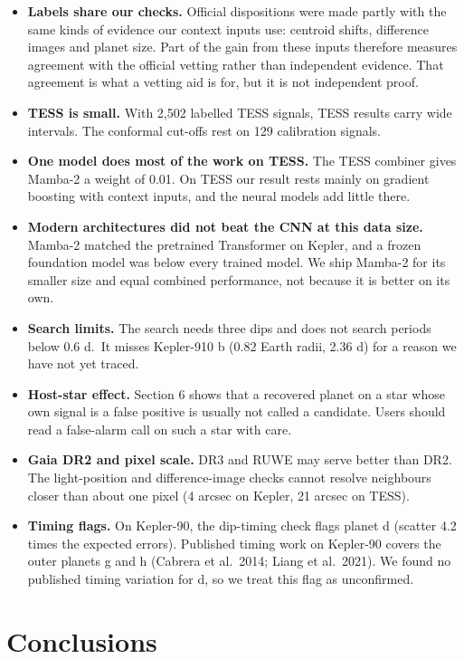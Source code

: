 \documentclass[fleqn,usenatbib]{mnras}
\providecommand{\tightlist}{\setlength{\itemsep}{0pt}\setlength{\parskip}{0pt}}
\begin{document}
\begin{itemize}
\tightlist
\item
  \textbf{Labels share our checks.} Official dispositions were made partly with the same kinds of evidence our context inputs use: centroid shifts, difference images and planet size. Part of the gain from these inputs therefore measures agreement with the official vetting rather than independent evidence. That agreement is what a vetting aid is for, but it is not independent proof.
\item
  \textbf{TESS is small.} With 2,502 labelled TESS signals, TESS results carry wide intervals. The conformal cut-offs rest on 129 calibration signals.
\item
  \textbf{One model does most of the work on TESS.} The TESS combiner gives Mamba-2 a weight of 0.01. On TESS our result rests mainly on gradient boosting with context inputs, and the neural models add little there.
\item
  \textbf{Modern architectures did not beat the CNN at this data size.} Mamba-2 matched the pretrained Transformer on Kepler, and a frozen foundation model was below every trained model. We ship Mamba-2 for its smaller size and equal combined performance, not because it is better on its own.
\item
  \textbf{Search limits.} The search needs three dips and does not search periods below 0.6 d.~It misses Kepler-910 b (0.82 Earth radii, 2.36 d) for a reason we have not yet traced.
\item
  \textbf{Host-star effect.} Section 6 shows that a recovered planet on a star whose own signal is a false positive is usually not called a candidate. Users should read a false-alarm call on such a star with care.
\item
  \textbf{Gaia DR2 and pixel scale.} DR3 and RUWE may serve better than DR2. The light-position and difference-image checks cannot resolve neighbours closer than about one pixel (4 arcsec on Kepler, 21 arcsec on TESS).
\item
  \textbf{Timing flags.} On Kepler-90, the dip-timing check flags planet d (scatter 4.2 times the expected errors). Published timing work on Kepler-90 covers the outer planets g and h (Cabrera et al.~2014; Liang et al.~2021). We found no published timing variation for d, so we treat this flag as unconfirmed.
\end{itemize}

\section{Conclusions}
\end{document}
